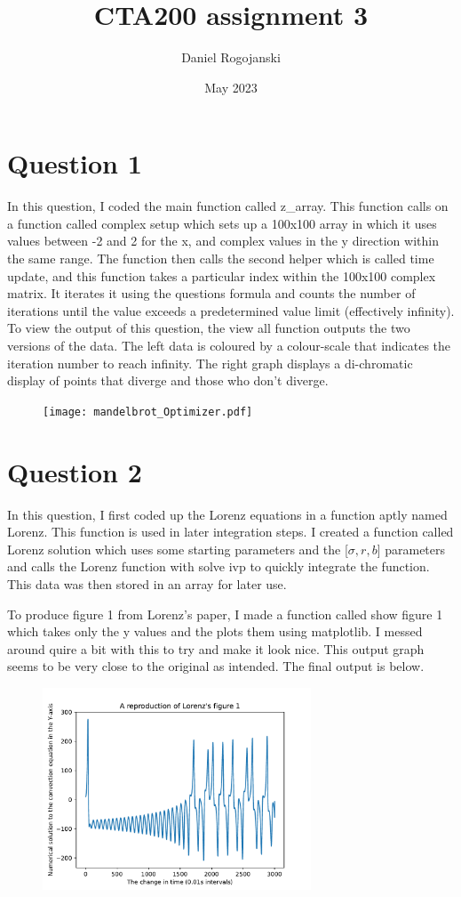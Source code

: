 \documentclass{article}
\title{CTA200 assignment 3}
\author{Daniel Rogojanski}
\date{May 2023}
\begin{document}
\maketitle

\section*{Question 1}

In this question, I coded the main function called z\_array. This function calls on a function called complex setup which sets up a 100x100 array in which it uses values between -2 and 2 for the x, and complex values in the y direction within the same range. The function then calls the second helper which is called time update, and this function takes a particular index within the 100x100 complex matrix. It iterates it using the questions formula and counts the number of iterations until the value exceeds a predetermined value limit (effectively infinity). To view the output of this question, the view all function outputs the two versions of the data. The left data is coloured by a colour-scale that indicates the iteration number to reach infinity. The right graph displays a di-chromatic display of points that diverge and those who don't diverge. 

\begin{figure}[htp]
    \centering
    \texttt{[image: mandelbrot\_Optimizer.pdf]}
\end{figure}

\section*{Question 2}

In this question, I first coded up the Lorenz equations in a function aptly named Lorenz. This function is used in later integration steps. I created a function called Lorenz solution which uses some starting parameters and the [$\sigma, r, b$] parameters and calls the Lorenz function with solve ivp to quickly integrate the function. This data was then stored in an array for later use.

To produce figure 1 from Lorenz's paper, I made a function called show figure 1 which takes only the y values and the plots them using matplotlib. I messed around quire a bit with this to try and make it look nice. This output graph seems to be very close to the original as intended. The final output is below. 

\begin{figure}[htp]
    \centering
    \includegraphics[width=8cm]{Figure_1.pdf}
\end{figure}
          
\end{document}
